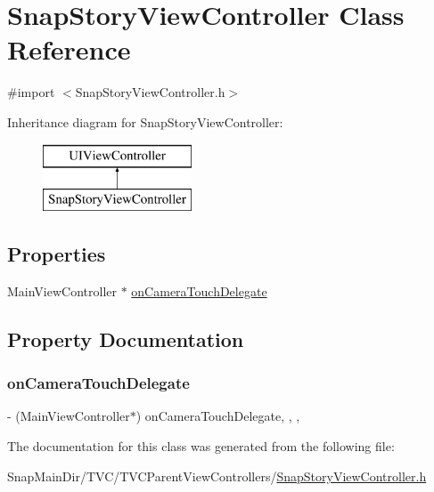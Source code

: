 \hypertarget{interface_snap_story_view_controller}{}\section{Snap\+Story\+View\+Controller Class Reference}
\label{interface_snap_story_view_controller}


{\ttfamily \#import $<$Snap\+Story\+View\+Controller.\+h$>$}

Inheritance diagram for Snap\+Story\+View\+Controller\+:\begin{figure}[H]
\begin{center}
\leavevmode
\includegraphics[height=2.000000cm]{interface_snap_story_view_controller}
\end{center}
\end{figure}
\subsection*{Properties}
\begin{DoxyCompactItemize}
\item 
Main\+View\+Controller $\ast$ \hyperlink{interface_snap_story_view_controller_a199c7ac5026d94c64a80414373bce4c1}{on\+Camera\+Touch\+Delegate}
\end{DoxyCompactItemize}


\subsection{Property Documentation}
\hypertarget{interface_snap_story_view_controller_a199c7ac5026d94c64a80414373bce4c1}{}\label{interface_snap_story_view_controller_a199c7ac5026d94c64a80414373bce4c1} 
\subsubsection{\texorpdfstring{on\+Camera\+Touch\+Delegate}{onCameraTouchDelegate}}
{\footnotesize\ttfamily -\/ (Main\+View\+Controller$\ast$) on\+Camera\+Touch\+Delegate\hspace{0.3cm}{\ttfamily [read]}, {\ttfamily [write]}, {\ttfamily [nonatomic]}, {\ttfamily [weak]}}



The documentation for this class was generated from the following file\+:\begin{DoxyCompactItemize}
\item 
Snap\+Main\+Dir/\+T\+V\+C/\+T\+V\+C\+Parent\+View\+Controllers/\hyperlink{_snap_story_view_controller_8h}{Snap\+Story\+View\+Controller.\+h}\end{DoxyCompactItemize}
